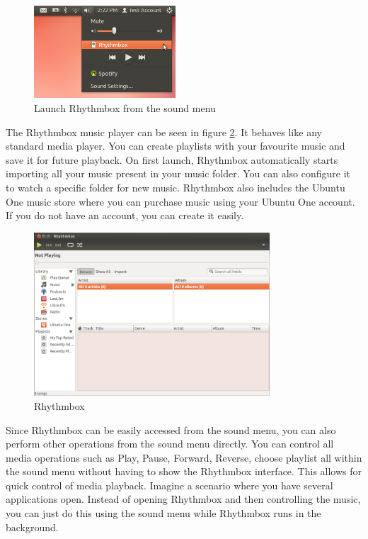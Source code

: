 \begin{figure}[h!]	
	\centering
	\includegraphics[width=150pt]{./images/basic-tasks/play-music1.png}
	\caption{Launch Rhythmbox from the sound menu}	
	\label{fig:play-music1}		
\end{figure}

\par \noindent The Rhythmbox music player can be seen in figure \ref{fig:play-music2}. It behaves like any standard media player. You can create playlists with your favourite music and save it for future playback. On first launch, Rhythmbox automatically starts importing all your music present in your music folder. You can also configure it to watch a specific folder for new music. Rhythmbox also includes the Ubuntu One music store where you can purchase music using your Ubuntu One account. If you do not have an account, you can create it easily. \\

\begin{figure}[h!]	
	\centering
	\includegraphics[width=250pt]{./images/basic-tasks/play-music2.png}
	\caption{Rhythmbox}	
	\label{fig:play-music2}		
\end{figure}

\par \noindent Since Rhythmbox can be easily accessed from the sound menu, you can also perform other operations from the sound menu directly. You can control all media operations such as Play, Pause, Forward, Reverse, choose playlist all within the sound menu without having to show the Rhythmbox interface. This allows for quick control of media playback. Imagine a scenario where you have several applications open. Instead of opening Rhythmbox and then controlling the music, you can just do this using the sound menu while Rhythmbox runs in the background. \\

